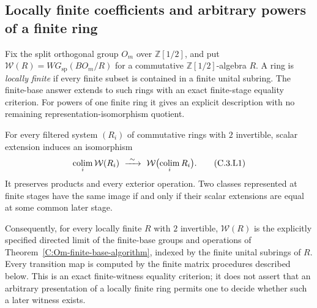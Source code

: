 \subsection{Locally finite coefficients and arbitrary powers of a finite ring}
\label{C:locally-finite-subsection}

Fix the split orthogonal group $O_m$ over $\mathbb Z[1/2]$, and put
$\mathcal W(R)=WG_{\mathrm{sp}}(BO_m/R)$ for a commutative
$\mathbb Z[1/2]$-algebra $R$. A ring is \emph{locally finite} if every
finite subset is contained in a finite unital subring. The finite-base
answer extends to such rings with an exact finite-stage equality
criterion. For powers of one finite ring it gives an explicit
description with no remaining representation-isomorphism quotient.

\begin{theorem}
\label{C:splitWG-filtered-colimits}
For every filtered system $(R_i)$ of commutative rings with $2$
invertible, scalar extension induces an isomorphism
\[
 \mathop{\rm colim}_i\mathcal W(R_i)
       \ \xrightarrow{\ \sim\ }\ 
 \mathcal W\bigl(\mathop{\rm colim}_iR_i\bigr) .             \tag{C.3.L1}
\]
It preserves products and every exterior operation. Two classes
represented at finite stages have the same image if and only if
their scalar extensions are equal at some common later stage.

Consequently, for every locally finite $R$ with $2$ invertible,
$\mathcal W(R)$ is the explicitly specified directed limit of the
finite-base groups and operations of
Theorem~\ref{C:Om-finite-base-algorithm}, indexed by the finite unital
subrings of $R$. Every transition map is computed by the finite
matrix procedures described below. This is an exact finite-witness
equality criterion; it does not assert that an arbitrary presentation
of a locally finite ring permits one to decide whether such a later
witness exists.
\end{theorem}
